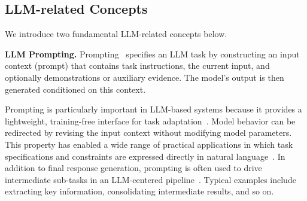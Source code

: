 \subsection{LLM-related Concepts}
We introduce two fundamental LLM-related concepts below. 

{\bf LLM Prompting.}
Prompting~\cite{brown2020languagemodelsfewshotlearners, dong2024surveyincontextlearning,liu2021pretrainpromptpredictsystematic} specifies an LLM task by constructing an input context (prompt) that contains task instructions, the current input, and optionally demonstrations or auxiliary evidence. The model's output is then generated conditioned on this context. 

Prompting is particularly important in LLM-based systems because it provides a lightweight, training-free interface for task adaptation~\cite{liu2021pretrainpromptpredictsystematic}. Model behavior can be redirected by revising the input context without modifying model parameters. This property has enabled a wide range of practical applications in which task specifications and constraints are expressed directly in natural language~\cite{ouyang2022training,achiam2023gpt}.
%
In addition to final response generation, prompting is often used to drive intermediate sub-tasks in an LLM-centered pipeline~\cite{yao2023reactsynergizingreasoningacting,schick2024toolformer,asai2023self, khattab2023dspy}. Typical examples include extracting key information, consolidating intermediate results, and so on. 








